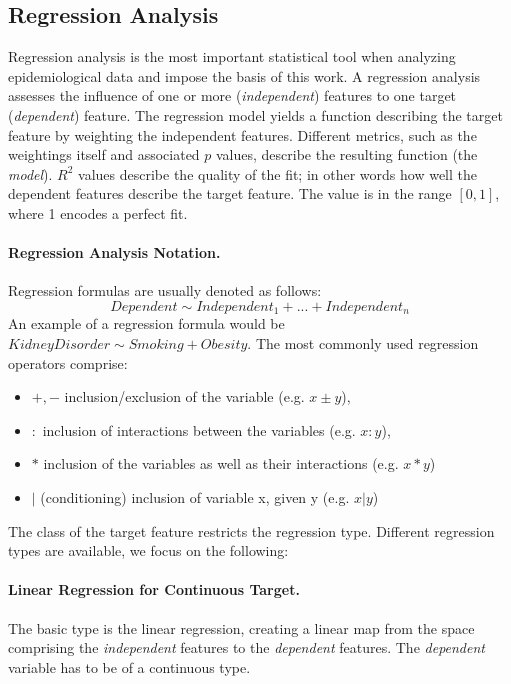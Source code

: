 \documentclass[journal]{style/vgtc} 			          %
\begin{document}
\subsection{Regression Analysis} \label{sec:RegressionAnalysis}
Regression analysis is the most important statistical tool when analyzing epidemiological data and impose the basis of this work.
A regression analysis assesses the influence of one or more (\emph{independent}) features to one target (\emph{dependent}) feature.
The regression model yields a function describing the target feature by weighting the independent features.
Different metrics, such as the weightings itself and associated $p$ values, describe the resulting function (the \emph{model}).
$R^2$ values describe the quality of the fit; in other words how well the dependent features describe the target feature.
The value is in the range $[0, 1]$, where 1 encodes a perfect fit.

\paragraph{Regression Analysis Notation.} Regression formulas are usually denoted as follows:
\begin{equation}
Dependent \sim Independent_1 + ... + Independent_n
\label{eq:RegressionNotation}
\end{equation}
An example of a regression formula would be $KidneyDisorder \sim Smoking + Obesity$.
The most commonly used regression operators comprise:
\begin{itemize}
	\item $+,-$ inclusion/exclusion of the variable (e.g. $x\pm y$),
	\item $:$ inclusion of interactions between the variables (e.g. $x:y$),
	\item $*$ inclusion of the variables as well as their interactions (e.g. $x*y$)
	\item $|$ (conditioning) inclusion of variable x, given y (e.g. $x|y$)
\end{itemize}
The class of the target feature restricts the regression type.
Different regression types are available, we focus on the following:
\paragraph{Linear Regression for Continuous Target.} The basic type is the linear regression, creating a linear map from the space comprising the \emph{independent} features to the \emph{dependent} features.
The \emph{dependent} variable has to be of a continuous type.
\end{document}
